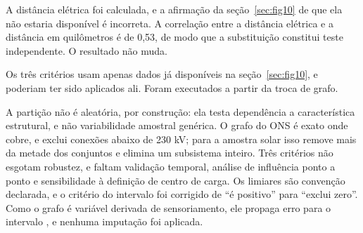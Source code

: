 A distância elétrica foi calculada, e a afirmação da seção~\ref{sec:fig10} de
que ela não estaria disponível é incorreta. A correlação entre a distância
elétrica e a distância em quilômetros é de 0,53, de modo que a substituição
constitui teste independente. O resultado não muda.

 Os três critérios usam apenas
dados já disponíveis na seção~\ref{sec:fig10}, e poderiam ter sido aplicados
ali. Foram executados a partir da troca de grafo.

\begin{objecao}
A partição não é aleatória, por construção: ela testa dependência a
característica estrutural, e não variabilidade amostral genérica. O grafo do ONS
é exato onde cobre, e exclui conexões abaixo de 230 kV; para a amostra solar
isso remove mais da metade dos conjuntos e elimina um subsistema inteiro. Três
critérios não esgotam robustez, e faltam validação temporal, análise de
influência ponto a ponto e sensibilidade à definição de centro de carga. Os
limiares são convenção declarada, e o critério do intervalo foi corrigido de
``é positivo'' para ``exclui zero''. Como o grafo é variável derivada de
sensoriamento, ele propaga erro para o intervalo \cite{proctor2023}, e nenhuma
imputação foi aplicada.
\end{objecao}
